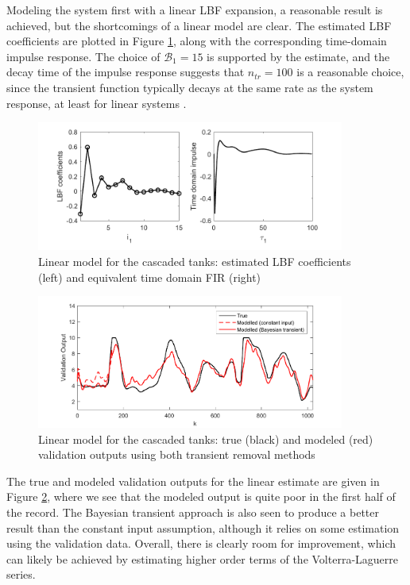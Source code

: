 Modeling the system first with a linear LBF expansion, a reasonable result is achieved, but the shortcomings of a linear model are clear. The estimated LBF coefficients are plotted in Figure \ref{fig:LinearTankEst}, along with the corresponding time-domain impulse response. The choice of $\mathcal{B}_1=15$ is supported by the estimate, and the decay time of the impulse response suggests that $n_{tr}=100$ is a reasonable choice, since the transient function typically decays at the same rate as the system response, at least for linear systems \cite{Lataire2016}.

\begin{figure}[h]
\centering
\includegraphics[width=0.9\textwidth]{Chapter6_CaseStudies/LinearLBFs.pdf}
\caption{Linear model for the cascaded tanks: estimated LBF coefficients (left) and equivalent time domain FIR (right)}
\label{fig:LinearTankEst}
\end{figure}

\begin{figure}[h]
\centering
\includegraphics[width=0.9\textwidth]{Chapter6_CaseStudies/LinearValidation.pdf}
\caption{Linear model for the cascaded tanks: true (black) and modeled (red) validation outputs using both transient removal methods}
\label{fig:LinearTankVal}
\end{figure}

The true and modeled validation outputs for the linear estimate are given in Figure \ref{fig:LinearTankVal}, where we see that the modeled output is quite poor in the first half of the record. The Bayesian transient approach is also seen to produce a better result than the constant input assumption, although it relies on some estimation using the validation data. Overall, there is clearly room for improvement, which can likely be achieved by estimating higher order terms of the Volterra-Laguerre series.

